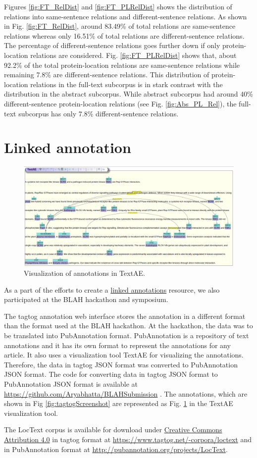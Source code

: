 Figures \ref{fig:FT_RelDist} and \ref{fig:FT_PLRelDist} shows the distribution of relations into same-sentence relations and different-sentence relations. As shown in Fig. \ref{fig:FT_RelDist}, around 83.49\% of total relations are same-sentence relations whereas only 16.51\% of total relations are different-sentence relations. The percentage of different-sentence relations goes further down if only protein-location relations are considered. Fig. \ref{fig:FT_PLRelDist} shows that, about 92.2\% of the total protein-location relations are same-sentence relations while remaining 7.8\% are different-sentence relations. This distribution of protein-location relations in the full-text subcorpus is in stark contrast with the distribution in the abstract subcorpus. While abstract subcorpus had around 40\% different-sentence protein-location relations (see Fig. \ref{fig:Abs_PL_Rel}), the full-text subcorpus has only 7.8\% different-sentence relations.

\section{Linked annotation}


\begin{figure}
\centering
\includegraphics[scale=0.25]{figures/TextAE_Vis.png}
\caption{Visualization of annotations in TextAE.}\label{fig:TextAEVis}
\end{figure}

As a part of the efforts to create a \hyperref[http://2015.linkedannotation.org/background]{linked annotations} resource, we also participated at the BLAH \cite{blah} hackathon and symposium.

The tagtog annotation web interface stores the annotation in a different format than the format used at the BLAH hackathon. At the hackathon, the data was to be translated into PubAnnotation format. PubAnnotation \cite{kim2012pubannotation} is a repository of text annotations and it has its own format to represent the annotations for any article. It also uses a visualization tool TextAE \cite{textae} for visualizing the annotations. Therefore, the data in tagtog JSON format was converted to PubAnnotation JSON format. The code for converting data in tagtog JSON format to PubAnnotation JSON format is available at \url{https://github.com/Aryabhatta/BLAHSubmission} \cite{blahsubmission}. The annotations, which are shown in Fig \ref{fig:tagtogScreenshot} are represented as Fig. \ref{fig:TextAEVis} in the TextAE visualization tool. 

The LocText corpus is available for download under \hyperref[https://creativecommons.org/licenses/by/4.0/]{Creative Commons Attribution 4.0} in tagtog format at \url{https://www.tagtog.net/-corpora/loctext} and in PubAnnotation format at \url{http://pubannotation.org/projects/LocText}.